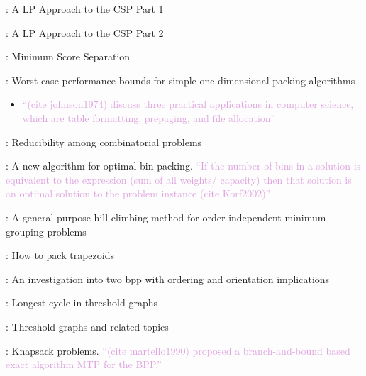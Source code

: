 \documentclass[oribibl]{llncs}
\begin{document}
\cite{gilmore1961}: A LP Approach to the CSP Part 1

\cite{gilmore1963}: A LP Approach to the CSP Part 2

\cite{goulimis2004}: Minimum Score Separation

\cite{johnson1974}: Worst case performance bounds for simple one-dimensional packing algorithms
\begin{itemize}
	\item \textcolor{Plum}{ ``(cite johnson1974) discuss three practical applications in computer science, which are table formatting, prepaging, and file allocation''}
\end{itemize}

\cite{karp1972}: Reducibility among combinatorial problems

\cite{korf2002}: A new algorithm for optimal bin packing. \textcolor{Plum}{``If the number of bins in a solution is equivalent to the expression (sum of all weights/ capacity) then that solution is an optimal solution to the problem instance (cite Korf2002)''} 

\cite{lewis2009}: A general-purpose hill-climbing method for order independent minimum grouping problems

\cite{lewis2017}: How to pack trapezoids

\cite{lewis2011}: An investigation into two bpp with ordering and orientation implications

\cite{mahadev1994}: Longest cycle in threshold graphs

\cite{mahadev1995}: Threshold graphs and related topics

\cite{martello1990b}: Knapsack problems.\textcolor{Plum}{ ``(cite martello1990) proposed a branch-and-bound based exact algorithm MTP for the BPP.''} 








\end{document}
